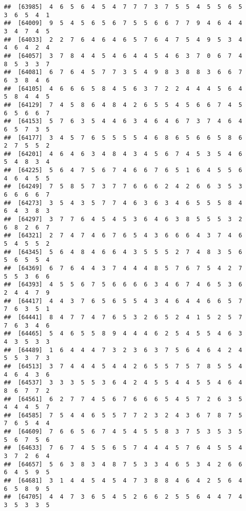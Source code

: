 \documentclass[
]{book}
\begin{document}
\begin{verbatim}
##  [63985]  4  6  5  6  4  5  4  7  7  7  3  7  5  5  4  5  5  6  5  3  6  5  4  1
##  [64009]  9  5  4  5  6  5  6  7  5  5  6  6  7  7  9  4  6  4  4  3  4  7  4  5
##  [64033]  2  2  7  6  4  6  4  6  5  7  6  4  7  5  4  9  5  3  4  4  6  4  2  4
##  [64057]  3  7  8  4  4  5  4  6  4  4  5  4  6  3  7  0  6  7  4  8  5  3  3  7
##  [64081]  6  7  6  4  5  7  7  3  5  4  9  8  3  8  8  3  6  6  7  6  3  8  4  6
##  [64105]  4  6  6  6  5  8  4  5  6  3  7  2  2  4  4  4  5  6  4  5  8  4  4  5
##  [64129]  7  4  5  8  6  4  8  4  2  6  5  5  4  5  6  6  7  4  5  6  5  6  6  7
##  [64153]  5  7  6  3  5  4  4  6  3  4  6  4  6  7  3  7  4  6  4  6  5  7  3  5
##  [64177]  3  4  5  7  6  5  5  5  5  4  6  8  6  5  6  6  5  8  6  2  7  5  5  2
##  [64201]  4  6  4  6  3  4  8  4  3  4  5  6  7  4  5  3  5  4  6  5  4  8  3  4
##  [64225]  5  6  4  7  5  6  7  4  6  6  7  6  5  1  6  4  5  5  6  4  6  4  5  5
##  [64249]  7  5  8  5  7  3  7  7  6  6  6  2  4  2  6  6  3  5  3  6  6  6  6  7
##  [64273]  3  5  4  3  5  7  7  4  6  3  6  3  4  6  5  5  5  8  4  6  4  3  8  3
##  [64297]  3  7  7  6  4  5  4  5  3  6  4  6  3  8  5  5  5  3  2  6  8  2  6  7
##  [64321]  2  7  4  7  4  6  7  6  5  4  3  6  6  6  4  3  7  4  6  5  4  5  5  2
##  [64345]  5  6  4  8  4  6  6  4  3  5  5  5  2  7  4  8  3  5  6  5  6  5  5  4
##  [64369]  6  7  6  4  4  3  7  4  4  4  8  5  7  6  7  5  4  2  7  5  5  3  6  6
##  [64393]  4  5  5  6  7  5  6  6  6  6  3  4  6  7  4  6  5  3  6  2  4  4  7  9
##  [64417]  4  4  3  7  6  5  6  5  5  4  3  4  6  4  4  6  6  5  7  7  6  3  5  1
##  [64441]  8  4  7  7  4  7  6  5  3  2  6  5  2  4  1  5  2  5  7  7  6  3  4  6
##  [64465]  5  4  6  5  5  8  9  4  4  4  6  2  5  4  5  5  4  6  3  4  3  5  3  3
##  [64489]  1  6  4  4  4  7  3  2  3  6  3  7  5  6  4  6  4  2  4  5  5  3  7  3
##  [64513]  3  7  4  4  4  5  4  4  2  6  5  5  7  5  7  8  5  5  4  4  6  4  3  6
##  [64537]  3  3  3  5  5  3  6  4  2  4  5  5  4  4  5  5  4  6  4  8  6  7  7  2
##  [64561]  6  2  7  7  4  5  6  7  6  6  6  5  4  5  7  2  6  3  5  4  4  4  5  7
##  [64585]  7  5  4  4  6  5  5  7  7  2  3  2  4  3  6  7  8  7  5  7  6  5  4  4
##  [64609]  7  6  6  5  6  7  4  5  4  5  5  8  3  7  5  3  5  3  5  5  6  7  5  6
##  [64633]  7  6  7  4  5  5  6  5  7  4  4  4  5  7  6  4  5  5  4  3  7  2  6  4
##  [64657]  5  6  3  8  3  4  8  7  5  3  3  4  6  5  3  4  2  6  6  6  4  5  9  5
##  [64681]  3  1  4  4  5  4  5  4  7  3  8  8  4  6  4  2  5  6  4  6  5  8  9  5
##  [64705]  4  4  7  3  6  5  4  5  2  6  6  2  5  5  6  4  4  7  4  3  5  3  3  5

\end{verbatim}
\end{document}
